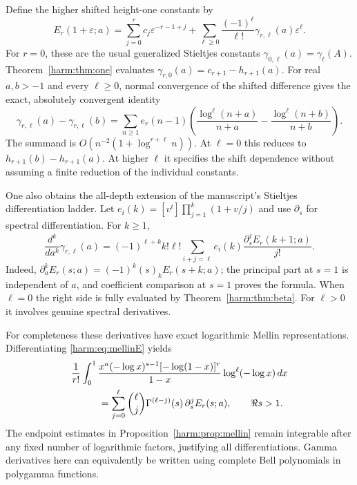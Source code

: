 Define the higher shifted height-one constants by
\begin{equation}\label{harm:eq:Stieltjes}
 E_r(1+\varepsilon;a)
 =\sum_{j=0}^{r}c_j\varepsilon^{-r-1+j}
     +\sum_{\ell\geq0}\frac{(-1)^\ell}{\ell!}
                   \gamma_{r,\ell}(a)\varepsilon^\ell.
\end{equation}
For $r=0$, these are the usual generalized Stieltjes constants
$\gamma_{0,\ell}(a)=\gamma_\ell(A)$.
Theorem~\ref{harm:thm:one} evaluates
$\gamma_{r,0}(a)=c_{r+1}-h_{r+1}(a)$.
For real $a,b>-1$ and every $\ell\geq0$, normal convergence of the
shifted difference gives the exact, absolutely convergent identity
\begin{equation}\label{harm:eq:shiftStieltjes}
 \gamma_{r,\ell}(a)-\gamma_{r,\ell}(b)
  =\sum_{n\geq1}e_r(n-1)
       \left(\frac{\log^\ell(n+a)}{n+a}
                  -\frac{\log^\ell(n+b)}{n+b}\right).
\end{equation}
The summand is $O(n^{-2}(1+\log^{r+\ell}n))$.  At $\ell=0$
this reduces to $h_{r+1}(b)-h_{r+1}(a)$.  At higher $\ell$ it
specifies the shift dependence without assuming a finite reduction
of the individual constants.

One also obtains the all-depth extension of the manuscript's
Stieltjes differentiation ladder.  Let
$e_i(k)=[v^i]\prod_{j=1}^k(1+v/j)$ and use $\partial_s$ for
spectral differentiation.  For $k\geq1$,
\begin{equation}\label{harm:eq:Stieltjesderivative}
 \frac{d^k}{da^k}\gamma_{r,\ell}(a)
 =(-1)^{\ell+k}k!\ell!
      \sum_{i+j=\ell}e_i(k)
             \frac{\partial_s^j E_r(k+1;a)}{j!}.
\end{equation}
Indeed, $\partial_a^kE_r(s;a)=(-1)^k(s)_kE_r(s+k;a)$;
the principal part at $s=1$ is independent of $a$, and coefficient
comparison at $s=1$ proves the formula.  When $\ell=0$ the right
side is fully evaluated by Theorem~\ref{harm:thm:beta}.  For
$\ell>0$ it involves genuine spectral derivatives.

For completeness these derivatives have exact logarithmic Mellin
representations.  Differentiating \eqref{harm:eq:mellinE} yields
\begin{align}
 &\frac1{r!}\int_0^1
   \frac{x^a(-\log x)^{s-1}[-\log(1-x)]^r}{1-x}
                     \log^\ell(-\log x)\,dx\notag\\
 &\hspace{1cm}
 =\sum_{j=0}^{\ell}\binom{\ell}{j}
      \Gamma^{(\ell-j)}(s)\,\partial_s^jE_r(s;a),
      \qquad \Re s>1.\label{harm:eq:logspectral}
\end{align}
The endpoint estimates in Proposition~\ref{harm:prop:mellin} remain
integrable after any fixed number of logarithmic factors, justifying
all differentiations.  Gamma derivatives here can equivalently be
written using complete Bell polynomials in polygamma functions.


